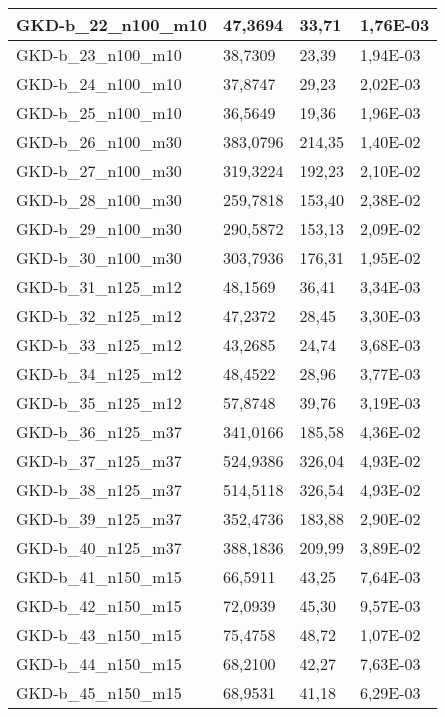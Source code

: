 \begin{table}[!ht]
\begin{adjustbox}{height=12cm}
\begin{tabular}{|l|l|l|l|}
        GKD-b\_22\_n100\_m10 & 47,3694 & 33,71 & 1,76E-03 \\ \hline
        GKD-b\_23\_n100\_m10 & 38,7309 & 23,39 & 1,94E-03 \\ \hline
        GKD-b\_24\_n100\_m10 & 37,8747 & 29,23 & 2,02E-03 \\ \hline
        GKD-b\_25\_n100\_m10 & 36,5649 & 19,36 & 1,96E-03 \\ \hline
        GKD-b\_26\_n100\_m30 & 383,0796 & 214,35 & 1,40E-02 \\ \hline
        GKD-b\_27\_n100\_m30 & 319,3224 & 192,23 & 2,10E-02 \\ \hline
        GKD-b\_28\_n100\_m30 & 259,7818 & 153,40 & 2,38E-02 \\ \hline
        GKD-b\_29\_n100\_m30 & 290,5872 & 153,13 & 2,09E-02 \\ \hline
        GKD-b\_30\_n100\_m30 & 303,7936 & 176,31 & 1,95E-02 \\ \hline
        GKD-b\_31\_n125\_m12 & 48,1569 & 36,41 & 3,34E-03 \\ \hline
        GKD-b\_32\_n125\_m12 & 47,2372 & 28,45 & 3,30E-03 \\ \hline
        GKD-b\_33\_n125\_m12 & 43,2685 & 24,74 & 3,68E-03 \\ \hline
        GKD-b\_34\_n125\_m12 & 48,4522 & 28,96 & 3,77E-03 \\ \hline
        GKD-b\_35\_n125\_m12 & 57,8748 & 39,76 & 3,19E-03 \\ \hline
        GKD-b\_36\_n125\_m37 & 341,0166 & 185,58 & 4,36E-02 \\ \hline
        GKD-b\_37\_n125\_m37 & 524,9386 & 326,04 & 4,93E-02 \\ \hline
        GKD-b\_38\_n125\_m37 & 514,5118 & 326,54 & 4,93E-02 \\ \hline
        GKD-b\_39\_n125\_m37 & 352,4736 & 183,88 & 2,90E-02 \\ \hline
        GKD-b\_40\_n125\_m37 & 388,1836 & 209,99 & 3,89E-02 \\ \hline
        GKD-b\_41\_n150\_m15 & 66,5911 & 43,25 & 7,64E-03 \\ \hline
        GKD-b\_42\_n150\_m15 & 72,0939 & 45,30 & 9,57E-03 \\ \hline
        GKD-b\_43\_n150\_m15 & 75,4758 & 48,72 & 1,07E-02 \\ \hline
        GKD-b\_44\_n150\_m15 & 68,2100 & 42,27 & 7,63E-03 \\ \hline
        GKD-b\_45\_n150\_m15 & 68,9531 & 41,18 & 6,29E-03 \\ \hline

\end{tabular}
\end{adjustbox}
\end{table}
